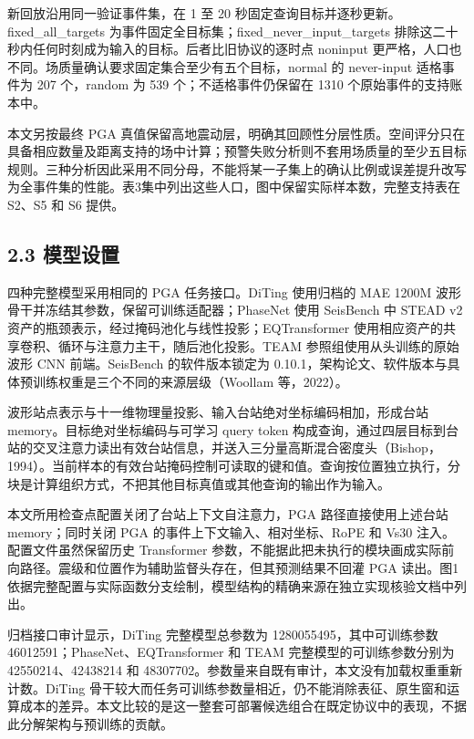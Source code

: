 \documentclass[UTF8,a4paper,11pt]{ctexart}
\begin{document}
新回放沿用同一验证事件集，在 1 至 20 秒固定查询目标并逐秒更新。fixed\_all\_targets 为事件固定全目标集；fixed\_never\_input\_targets 排除这二十秒内任何时刻成为输入的目标。后者比旧协议的逐时点 noninput 更严格，人口也不同。场质量确认要求固定集合至少有五个目标，normal 的 never-input 适格事件为 207 个，random 为 539 个；不适格事件仍保留在 1310 个原始事件的支持账本中。

本文另按最终 PGA 真值保留高地震动层，明确其回顾性分层性质。空间评分只在具备相应数量及距离支持的场中计算；预警失败分析则不套用场质量的至少五目标规则。三种分析因此采用不同分母，不能将某一子集上的确认比例或误差提升改写为全事件集的性能。表3集中列出这些人口，图中保留实际样本数，完整支持表在 S2、S5 和 S6 提供。

\subsection*{2.3 模型设置}

四种完整模型采用相同的 PGA 任务接口。DiTing 使用归档的 MAE 1200M 波形骨干并冻结其参数，保留可训练适配器；PhaseNet 使用 SeisBench 中 STEAD v2 资产的瓶颈表示，经过掩码池化与线性投影；EQTransformer 使用相应资产的共享卷积、循环与注意力主干，随后池化投影。TEAM 参照组使用从头训练的原始波形 CNN 前端。SeisBench 的软件版本锁定为 0.10.1，架构论文、软件版本与具体预训练权重是三个不同的来源层级（Woollam 等，2022）。

波形站点表示与十一维物理量投影、输入台站绝对坐标编码相加，形成台站 memory。目标绝对坐标编码与可学习 query token 构成查询，通过四层目标到台站的交叉注意力读出有效台站信息，并送入三分量高斯混合密度头（Bishop，1994）。当前样本的有效台站掩码控制可读取的键和值。查询按位置独立执行，分块是计算组织方式，不把其他目标真值或其他查询的输出作为输入。

本文所用检查点配置关闭了台站上下文自注意力，PGA 路径直接使用上述台站 memory；同时关闭 PGA 的事件上下文输入、相对坐标、RoPE 和 Vs30 注入。配置文件虽然保留历史 Transformer 参数，不能据此把未执行的模块画成实际前向路径。震级和位置作为辅助监督头存在，但其预测结果不回灌 PGA 读出。图1依据完整配置与实际函数分支绘制，模型结构的精确来源在独立实现核验文档中列出。

归档接口审计显示，DiTing 完整模型总参数为 1280055495，其中可训练参数 46012591；PhaseNet、EQTransformer 和 TEAM 完整模型的可训练参数分别为 42550214、42438214 和 48307702。参数量来自既有审计，本文没有加载权重重新计数。DiTing 骨干较大而任务可训练参数量相近，仍不能消除表征、原生窗和运算成本的差异。本文比较的是这一整套可部署候选组合在既定协议中的表现，不据此分解架构与预训练的贡献。
\end{document}
